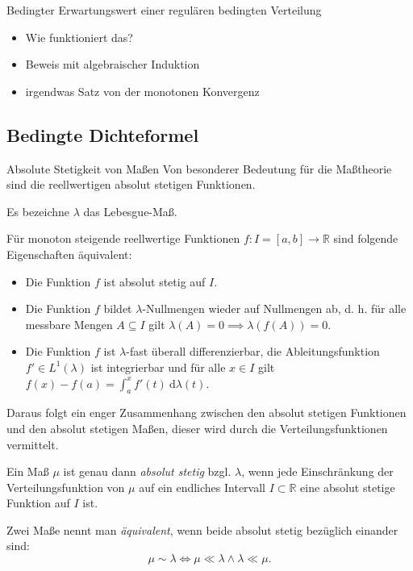 \begin{info}{Bedingter Erwartungswert einer regulären bedingten Verteilung}
    \begin{itemize}
        \item Wie funktioniert das?
        \item Beweis mit algebraischer Induktion
        \item irgendwas Satz von der monotonen Konvergenz
    \end{itemize}
\end{info}

\subsection{Bedingte Dichteformel}

\begin{bonus}{Absolute Stetigkeit von Maßen}
    Von besonderer Bedeutung für die Maßtheorie sind die reellwertigen absolut stetigen Funktionen.

    Es bezeichne $\lambda$ das Lebesgue-Maß.

    Für monoton steigende reellwertige Funktionen $f: I=[a,b]\to \mathbb{R}$ sind folgende Eigenschaften äquivalent:
    \begin{itemize}
        \item Die Funktion $f$ ist absolut stetig auf $I$.
        \item Die Funktion $f$ bildet $\lambda$-Nullmengen wieder auf Nullmengen ab, d. h. für alle messbare Mengen $A \subseteq I$ gilt $\lambda (A)=0\implies \lambda (f(A))=0$.
        \item Die Funktion $f$ ist $\lambda$-fast überall differenzierbar, die Ableitungsfunktion $f'\in L^{1}(\lambda )$ ist integrierbar und für alle $x \in I$ gilt $f(x)-f(a)=\int_{a}^{x}f'(t)\ \mathrm{d} \lambda (t)$.
    \end{itemize}
    Daraus folgt ein enger Zusammenhang zwischen den absolut stetigen Funktionen und den absolut stetigen Maßen, dieser wird durch die Verteilungsfunktionen vermittelt.

    Ein Maß $\mu$ ist genau dann \emph{absolut stetig} bzgl. $\lambda$, wenn jede Einschränkung der Verteilungsfunktion von $\mu$ auf ein endliches Intervall $I \subset \mathbb{R}$ eine absolut stetige Funktion auf $I$ ist.

    Zwei Maße nennt man \emph{äquivalent}, wenn beide absolut stetig bezüglich einander sind:
    \[
        \mu \sim \lambda \iff \mu \ll \lambda \land \lambda \ll \mu.
    \]
\end{bonus}

